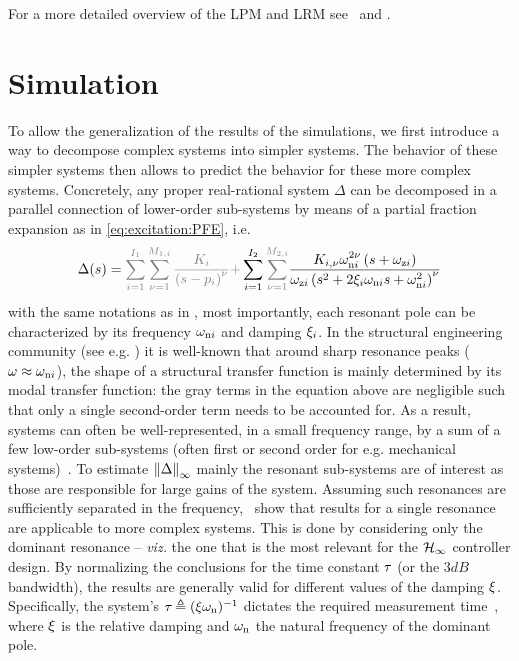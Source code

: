 For a more detailed overview of  the \gls{LPM} and \gls{LRM} see~\citep{Schoukens2009LPM,Pintelon2010LPM1,Pintelon2010LPM2,McKelvey2012LRM} and .


\section{Simulation}
\label{sec:lrmhinf:simulation}
To allow the generalization of the results of the simulations, we first introduce a way to decompose complex systems into simpler systems.
The behavior of these simpler systems then allows to predict the behavior for these more complex systems.
Concretely, any proper real-rational system $\Delta$ can be decomposed in a parallel connection of lower-order sub-systems by means of a partial fraction expansion as in \eqref{eq:excitation:PFE}, i.e.
\begin{equation}
\Delta(s) = 
         \deemph{
         \sum_{i=1}^{I_1} 
          \sum_{\multiplicity=1}^{M_{1,i}} 
            \frac{\dc[i]}
                      { \left( s - \pole[i] \right)^{\multiplicity}}
            + 
        }
        \sum_{i=1}^{I_2} 
          \deemph{\sum_{\multiplicity=1}^{M_{2,i}}}
           \frac{\dc[i,\multiplicity] \wn[i]^{2\multiplicity} \left( s + \wz[i] \right)}
                     {\wz[i] \left(s^2 + 2 \damping[i] \wn[i] s + \wn[i]^2 \right)^{\multiplicity}}
\end{equation}
with the same notations as in , most importantly, each resonant pole can be characterized by its frequency $\wn[i]$ and damping $\damping[i]$.
In the structural engineering community (see e.g. \citet[Chapter 2]{Gawronski2004}) it is well-known that around sharp resonance peaks ($\omega \approx \wn[i]$), the shape of a structural transfer function is mainly determined by its modal transfer function: the gray terms in the equation above are negligible such that only a single second-order term needs to be accounted for.
As a result, systems can often be well-represented, in a small frequency range, by a sum of a few low-order sub-systems (often first or second order for e.g. mechanical systems)~\citep[Section 2.2.2]{Gawronski2004}.
To estimate $\infnorm{\Delta}$ mainly the resonant sub-systems are of interest as those are responsible for large gains of the system.
Assuming such resonances are sufficiently separated in the frequency,~\citep{Schoukens2013LPMerror,Geerardyn2013TIM,Gawronski2004} show that results for a single resonance are applicable to more complex systems.
This is done by considering only the dominant resonance -- \emph{viz.} the one that is the most relevant for the $\Hinf{}$ controller design.
By normalizing the conclusions for the time constant $\timeconst$ (or the $3\unit{dB}$ bandwidth), the results are generally valid for different values of the damping $\damping$.
Specifically, the system's $\timeconst \isdef (\damping \wn)^{-1}$ dictates the required measurement time~\citep{Schoukens2013LPMerror}, where $\damping$ is the relative damping and $\wn$ the natural frequency of the dominant pole.


